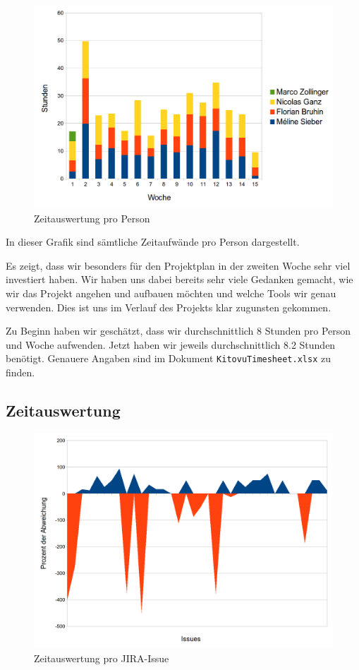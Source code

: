 \documentclass[a4paper]{article}
\begin{document}
\begin{figure}[H]
  \includegraphics[width=\linewidth]{./img/time_per_person.png}
  \caption{Zeitauswertung pro Person\protect\footnotemark}
\end{figure}

In dieser Grafik sind sämtliche Zeitaufwände pro Person dargestellt.

Es zeigt, dass wir besonders für den Projektplan in der zweiten Woche sehr viel investiert haben.
Wir haben uns dabei bereits sehr viele Gedanken gemacht, wie wir das Projekt angehen und aufbauen möchten und welche Tools wir genau verwenden. Dies ist uns im Verlauf des Projekts klar zugunsten gekommen.

Zu Beginn haben wir geschätzt, dass wir durchschnittlich 8 Stunden pro Person
und Woche aufwenden.
Jetzt haben wir jeweils durchschnittlich 8.2 Stunden benötigt.
Genauere Angaben sind im Dokument \verb|KitovuTimesheet.xlsx| zu finden.

\subsection{Zeitauswertung}

\begin{figure}[H]
  \includegraphics[width=\linewidth]{./img/time_per_issue.png}
  \caption{Zeitauswertung pro JIRA-Issue\protect\footnotemark}
\end{figure}
\end{document}

